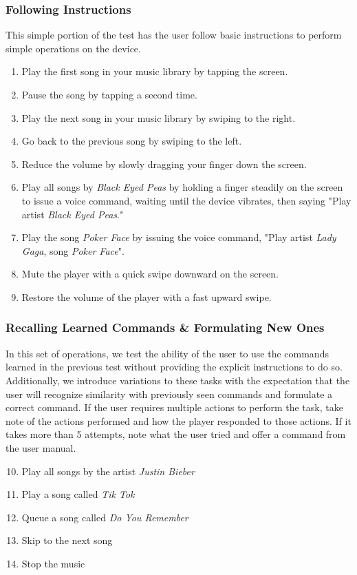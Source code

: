 \documentclass[12pt,letterpaper]{article}
\begin{document}
\subsubsection{Following Instructions}
This simple portion of the test has the user follow basic instructions to perform simple operations on the device. \begin{enumerate}
\item Play the first song in your music library by tapping the screen.
\item Pause the song by tapping a second time.
\item Play the next song in your music library by swiping to the right.
\item Go back to the previous song by swiping to the left.
\item Reduce the volume by slowly dragging your finger down the screen.
\item Play all songs by \textit{Black Eyed Peas} by holding a finger steadily on the screen to issue a voice command, waiting until the device vibrates, then saying "Play artist \textit{Black Eyed Peas}."
\item Play the song \textit{Poker Face} by issuing the voice command, "Play artist \textit{Lady Gaga}, song \textit{Poker Face}".
\item Mute the player with a quick swipe downward on the screen.
\item Restore the volume of the player with a fast upward swipe.
\end{enumerate}

\subsubsection{Recalling Learned Commands \& Formulating New Ones}
In this set of operations, we test the ability of the user to use the commands learned in the previous test without providing the explicit instructions to do so. Additionally, we introduce variations to these tasks with the expectation that the user will recognize similarity with previously seen commands and formulate a correct command. If the user requires multiple actions to perform the task, take note of the actions performed and how the player responded to those actions. If it takes more than 5 attempts, note what the user tried and offer a command from the user manual.
\begin{enumerate}
\setcounter{enumi}{9}
\item Play all songs by the artist \textit{Justin Bieber}
\item Play a song called \textit{Tik Tok}
\item Queue a song called \textit{Do You Remember}
\item Skip to the next song
\item Stop the music
\end{enumerate}
\end{document}

